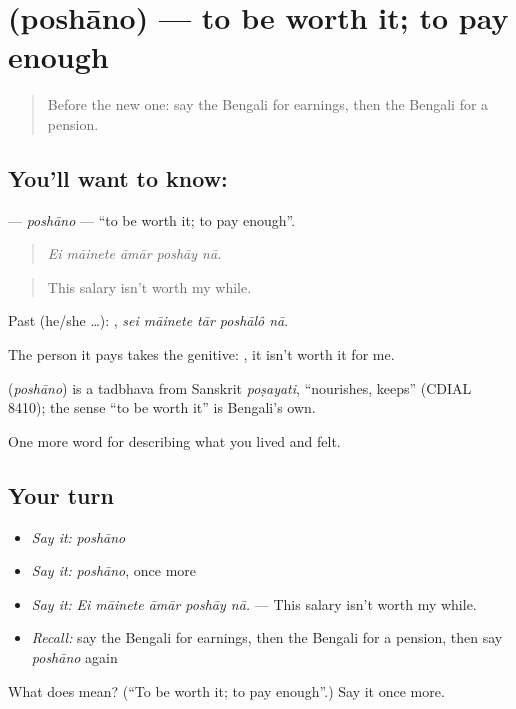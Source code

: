 \section[\texorpdfstring{\bn{পোষানো} (poshāno)}{পোষানো (poshāno)}]{ (poshāno) — to be worth it; to pay enough}

\label{lesson:BN-C495-poshano}



\begin{quote}
Before the new one: say the Bengali for earnings, then the Bengali for a pension.
\end{quote}

\subsection*{You'll want to know: }
\textbf{} — \emph{poshāno} — \textquotedblleft{}to be worth it; to pay enough\textquotedblright{}.

\begin{quote}
    
\end{quote}

\begin{quote}
\emph{Ei māinete āmār poshāy nā.}
\end{quote}

\begin{quote}
This salary isn't worth my while.
\end{quote}

Past (he/she …):     , \emph{sei māinete tār poshālô nā}.

The person it pays takes the genitive:   , it isn't worth it for me.

\begin{cousinweb}
\textbf{} (\emph{poshāno}) is a tadbhava from Sanskrit \emph{poṣayati}, \textquotedblleft{}nourishes, keeps\textquotedblright{} (CDIAL 8410); the sense \textquotedblleft{}to be worth it\textquotedblright{} is Bengali's own.
\end{cousinweb}

\begin{grammarlens}[title={What you've built}]
One more word for describing what you lived and felt.
\end{grammarlens}

\subsection*{Your turn}
\begin{itemize}
\raggedright
  \item \emph{Say it:} \emph{poshāno}
  \item \emph{Say it:} \emph{poshāno}, once more
  \item \emph{Say it:} \emph{Ei māinete āmār poshāy nā.} — This salary isn't worth my while.
  \item \emph{Recall:} say the Bengali for earnings, then the Bengali for a pension, then say \emph{poshāno} again
\end{itemize}

\begin{tcolorbox}[breakable,colback=teal!4,colframe=teal!35!black,title={Before you move on}]
What does  mean? (\textquotedblleft{}To be worth it; to pay enough\textquotedblright{}.) Say it once more.
\end{tcolorbox}
